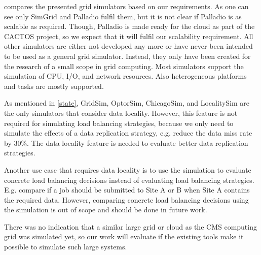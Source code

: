  compares the presented grid simulators based on our requirements. As one can see only SimGrid and Palladio fulfil them, but it is not clear if Palladio is as scalable as required. Though, Palladio is made ready for the cloud as part of the CACTOS project, so we expect that it will fulfil our scalability requirement. All other simulators are either not developed any more or have never been intended to be used as a general grid simulator. Instead, they only have been created for the research of a small scope in grid computing. Most simulators support the simulation of CPU, I/O, and network resources. Also heterogeneous platforms and tasks are mostly supported.

As mentioned in \cref{state}, GridSim, OptorSim, ChicagoSim, and LocalitySim are the only simulators that consider data locality. However, this feature is not required for simulating load balancing strategies, because we only need to simulate the effects of a data replication strategy, e.g. reduce the data miss rate by 30\%. The data locality feature is needed to evaluate better data replication strategies.

Another use case that requires data locality is to use the simulation to evaluate concrete load balancing decisions instead of evaluating load balancing strategies. E.g. compare if a job should be submitted to Site A or B when Site A contains the required data. However, comparing concrete load balancing decisions using the simulation is out of scope and should be done in future work.

There was no indication that a similar large grid or cloud as the CMS computing grid was simulated yet, so our work will evaluate if the existing tools make it possible to simulate such large systems.

